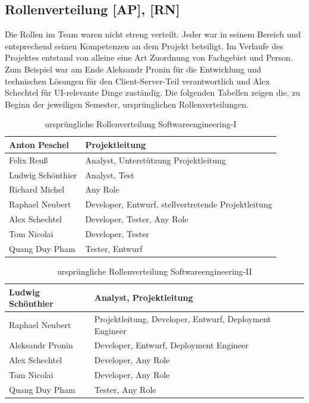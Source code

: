 \documentclass[10pt]{article}
\begin{document}
\subsection{Rollenverteilung [AP], [RN]}
    Die Rollen im Team waren nicht streng verteilt. Jeder war in seinem Bereich und entsprechend seinen Kompetenzen an 
    dem Projekt beteiligt. Im Verlaufe des Projektes entstand von alleine eine Art Zuordnung von Fachgebiet und Person.
    Zum Beispiel war am Ende Aleksandr Pronin für die Entwicklung und technischen Lösungen für den Client-Server-Teil verantwortlich 
    und Alex Schechtel für UI-relevante Dinge zuständig. Die folgenden Tabellen zeigen die, zu Beginn der jeweiligen Semester,
    ursprünglichen Rollenverteilungen.
\begin{table}[H]
    \begin{tabular}{|l|l|}
    \hline
    Anton  Peschel    & Projektleitung                                      \\ \hline
    Felix Reuß        & Analyst, Unterstützung Projektleitung               \\ \hline
    Ludwig Schönthier & Analyst,  Test                                      \\ \hline
    Richard Michel    & Any Role                                            \\ \hline
    Raphael Neubert   & Developer, Entwurf, stellvertretende Projektleitung \\ \hline
    Alex Schechtel    & Developer, Tester, Any Role                         \\ \hline
    Tom Nicolai       & Developer, Tester                                   \\ \hline
    Quang Duy Pham    & Tester, Entwurf                                     \\ \hline
    \end{tabular}
    \centering
    \caption{ursprüngliche Rollenverteilung Softwareengineering-I}
\end{table}
\begin{table}[H]
    \begin{tabular}{|l|l|}
    \hline
    Ludwig Schönthier & Analyst,  Projektleitung                                \\ \hline
    Raphael Neubert   & Projektleitung, Developer, Entwurf, Deployment Engineer \\ \hline
    Aleksandr Pronin  & Developer, Entwurf, Deployment Engineer                 \\ \hline
    Alex Schechtel    & Developer,  Any Role                                    \\ \hline
    Tom Nicolai       & Developer, Any Role                                     \\ \hline
    Quang Duy Pham    & Tester, Any Role                                        \\ \hline
    \end{tabular}
    \centering
    \caption{ursprüngliche Rollenverteilung Softwareengineering-II}
\end{table}
\end{document}
